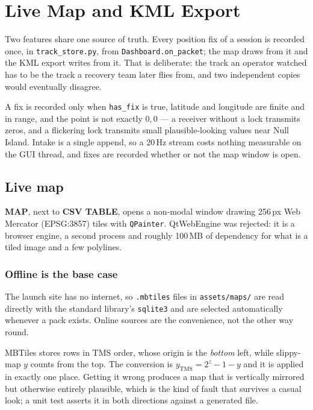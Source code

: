 \documentclass[11pt,a4paper]{article}
\begin{document}
\section{Live Map and KML Export}
\label{sec:map-kml}

Two features share one source of truth. Every position fix of a session is
recorded once, in \texttt{track\_store.py}, from
\texttt{Dashboard.on\_packet}; the map draws from it and the KML export
writes from it. That is deliberate: the track an operator watched has to be
the track a recovery team later flies from, and two independent copies would
eventually disagree.

A fix is recorded only when \texttt{has\_fix} is true, latitude and longitude
are finite and in range, and the point is not exactly $0,0$ --- a receiver
without a lock transmits zeros, and a flickering lock transmits small
plausible-looking values near Null Island. Intake is a single append, so a
20\,Hz stream costs nothing measurable on the GUI thread, and fixes are
recorded whether or not the map window is open.

\subsection{Live map}

\textbf{MAP}, next to \textbf{CSV TABLE}, opens a non-modal window drawing
256\,px Web Mercator (EPSG:3857) tiles with \texttt{QPainter}. QtWebEngine
was rejected: it is a browser engine, a second process and roughly 100\,MB of
dependency for what is a tiled image and a few polylines.

\subsubsection{Offline is the base case}

The launch site has no internet, so \texttt{.mbtiles} files in
\texttt{assets/maps/} are read directly with the standard library's
\texttt{sqlite3} and are selected automatically whenever a pack exists.
Online sources are the convenience, not the other way round.

MBTiles stores rows in TMS order, whose origin is the \emph{bottom} left,
while slippy-map $y$ counts from the top. The conversion is
$y_{\mathrm{TMS}} = 2^{z} - 1 - y$ and it is applied in exactly one place.
Getting it wrong produces a map that is vertically mirrored but otherwise
entirely plausible, which is the kind of fault that survives a casual look;
a unit test asserts it in both directions against a generated file.
\end{document}
